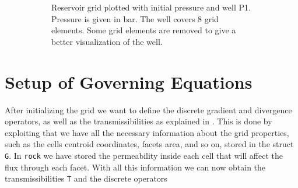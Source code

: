 \begin{figure}[H]
\begin{subfigure}[t]{0.48\textwidth}
        \caption{Reservoir grid plotted with initial pressure and well P1. Pressure is given in bar. The well covers 8 grid elements. Some grid elements are removed to give a better visualization of the well.}
        \label{fig:flowSolverGridWithWell}
    \end{subfigure}
    \caption{}
\end{figure}

\section{Setup of Governing Equations}
\label{sec:setupGovEq}
After initializing the grid we want to define the discrete gradient and divergence operators, as well as the transmissibilities as explained in . This is done by exploiting that we have all the necessary information about the grid properties, such as the cells centroid coordinates, facets area, and so on, stored in the struct \texttt{G}. In \texttt{rock} we have stored the permeability inside each cell that will affect the flux through each facet. With all this information we can now obtain the transmissibilities \texttt{T} and the discrete operators


